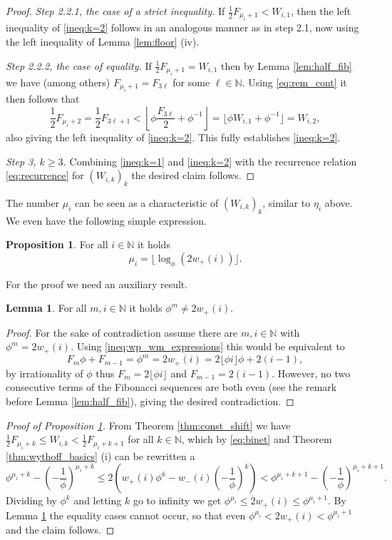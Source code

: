\documentclass[]{interact}
\newcommand{\bbN}{\mathbb{N}}
\theoremstyle{definition}
\newtheorem{lem}[thm]{Lemma}
\newtheorem{prop}[thm]{Proposition}
\numberwithin{table}{section} %
\numberwithin{figure}{section}
\begin{document}
\begin{proof}
    \textit{Step 2.2.1, the case of a strict inequality.} If $\frac12 F_{\mu_i+1} < W_{i, 1}$, then the left inequality of \eqref{ineq:k=2} follows in an analogous manner as in step 2.1, now using the left inequality of Lemma \ref{lem:floor} (iv).

    \textit{Step 2.2.2, the case of equality.} If $\frac12 F_{\mu_i+1} = W_{i, 1}$ then by Lemma \ref{lem:half_fib} we have (among others) $F_{\mu_i+1} = F_{3\ell}$ for some $\ell \in \bbN$. Using \eqref{eq:rem_cont} it then follows that
    $$
    \frac12 F_{\mu_i+2} = \frac12 F_{3\ell+1} < \left\lfloor \phi \frac{F_{3\ell}}{2} + \phi^{-1} \right\rfloor = \lfloor \phi W_{i, 1} + \phi^{-1} \rfloor = W_{i, 2},
    $$
    also giving the left inequality of \eqref{ineq:k=2}. This fully establishes \eqref{ineq:k=2}.

    \textit{Step 3, $k \geq 3$.} Combining \eqref{ineq:k=1} and \eqref{ineq:k=2} with the recurrence relation \eqref{eq:recurrence} for $(W_{i, k})_k$ the desired claim follows.
\end{proof}

The number $\mu_i$ can be seen as a characteristic of $(W_{i, k})_k$, similar to $\eta_i$ above. We even have the following simple expression.

\begin{prop} \label{prop:mu_formula}
    For all $i \in \bbN$ it holds
    $$
    \mu_i = \lfloor\log_\phi(2 w_+(i))\rfloor.
    $$
\end{prop}

For the proof we need an auxiliary result.

\begin{lem} \label{lem:no_sol}
    For all $m, i \in \bbN$ it holds $\phi^m \neq 2 w_+(i)$.
\end{lem}
\begin{proof}
    For the sake of contradiction assume there are $m, i \in \bbN$ with $\phi^m=2w_+(i)$. Using \eqref{ineq:wp_wm_expressions} this would be equivalent to
    $$
    F_m \phi + F_{m-1} = \phi^m = 2w_+(i) = 2 \lfloor \phi i\rfloor \phi + 2(i-1),
    $$
    by irrationality of $\phi$ thus $F_m = 2 \lfloor \phi i\rfloor$ and $F_{m-1} = 2(i-1)$. However, no two consecutive terms of the Fibonacci sequences are both even (see the remark before Lemma \ref{lem:half_fib}), giving the desired contradiction.
\end{proof}

\begin{proof}[Proof of Proposition \ref{prop:mu_formula}]
    From Theorem \ref{thm:const_shift} we have $\frac12 F_{\mu_i+k} \leq W_{i, k} < \frac12 F_{\mu_i+k+1}$ for all $k \in \bbN$, which by \eqref{eq:binet} and Theorem \ref{thm:wythoff_basics} (i) can be rewritten a
    $$
    \phi^{\mu_i+k} - \left(-\frac1\phi\right)^{\mu_i+k} \leq 2 \left(w_+(i) \phi^k - w_-(i) \left(-\frac1\phi\right)^k \right) < \phi^{\mu_i+k+1} - \left(-\frac1\phi\right)^{\mu_i+k+1}.
    $$
    Dividing by $\phi^k$ and letting $k$ go to infinity we get $\phi^{\mu_i} \leq 2 w_+(i) \leq \phi^{\mu_i+1}$. By Lemma \ref{lem:no_sol} the equality cases cannot occur, so that even $\phi^{\mu_i} < 2 w_+(i) < \phi^{\mu_i+1}$ and the claim follows.
\end{proof}
\end{document}
